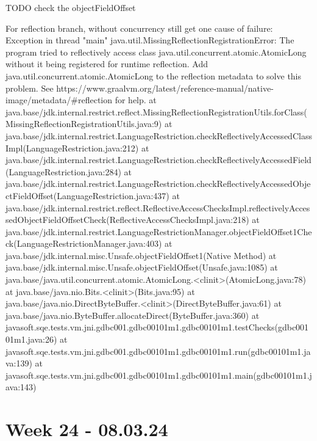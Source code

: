 TODO check the objectFieldOffset

For reflection branch, without concurrency still get one cause of failure:
Exception in thread "main" java.util.MissingReflectionRegistrationError: The program tried to reflectively access class java.util.concurrent.atomic.AtomicLong without it being registered for runtime reflection. Add java.util.concurrent.atomic.AtomicLong to the reflection metadata to solve this problem. See https://www.graalvm.org/latest/reference-manual/native-image/metadata/#reflection for help.
	at java.base/jdk.internal.restrict.reflect.MissingReflectionRegistrationUtils.forClass(MissingReflectionRegistrationUtils.java:9)
	at java.base/jdk.internal.restrict.LanguageRestriction.checkReflectivelyAccessedClassImpl(LanguageRestriction.java:212)
	at java.base/jdk.internal.restrict.LanguageRestriction.checkReflectivelyAccessedField(LanguageRestriction.java:284)
	at java.base/jdk.internal.restrict.LanguageRestriction.checkReflectivelyAccessedObjectFieldOffset(LanguageRestriction.java:437)
	at java.base/jdk.internal.restrict.reflect.ReflectiveAccessChecksImpl.reflectivelyAccessedObjectFieldOffsetCheck(ReflectiveAccessChecksImpl.java:218)
	at java.base/jdk.internal.restrict.LanguageRestrictionManager.objectFieldOffset1Check(LanguageRestrictionManager.java:403)
	at java.base/jdk.internal.misc.Unsafe.objectFieldOffset1(Native Method)
	at java.base/jdk.internal.misc.Unsafe.objectFieldOffset(Unsafe.java:1085)
	at java.base/java.util.concurrent.atomic.AtomicLong.<clinit>(AtomicLong.java:78)
	at java.base/java.nio.Bits.<clinit>(Bits.java:95)
	at java.base/java.nio.DirectByteBuffer.<clinit>(DirectByteBuffer.java:61)
	at java.base/java.nio.ByteBuffer.allocateDirect(ByteBuffer.java:360)
	at javasoft.sqe.tests.vm.jni.gdbc001.gdbc00101m1.gdbc00101m1.testChecks(gdbc00101m1.java:26)
	at javasoft.sqe.tests.vm.jni.gdbc001.gdbc00101m1.gdbc00101m1.run(gdbc00101m1.java:139)
	at javasoft.sqe.tests.vm.jni.gdbc001.gdbc00101m1.gdbc00101m1.main(gdbc00101m1.java:143)

\section{Week 24 - 08.03.24}

